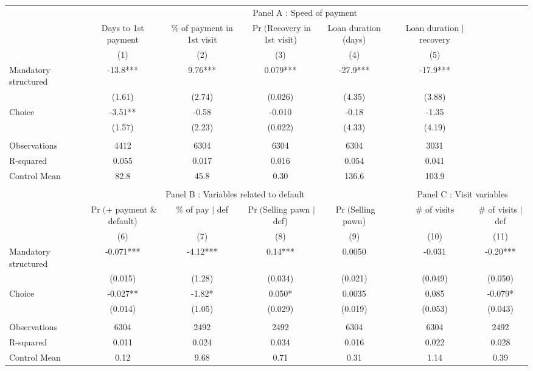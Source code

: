 \begin{tabular}{lccccccc}
\toprule
      & \multicolumn{7}{c}{Panel A  : Speed of payment} \\
\cmidrule{2-8}      & Days to 1st payment & \% of payment in 1st visit & $\Pr($Recovery in 1st visit) & Loan duration (days) &       & Loan duration $|$ recovery &  \\
\cmidrule{1-5}\cmidrule{7-8}      & (1)   & (2)   & (3)   & (4)   &       & (5)   &  \\
\cmidrule{1-5}\cmidrule{7-8}Mandatory structured & -13.8*** & 9.76*** & 0.079*** & -27.9*** &       & -17.9*** &  \\
      & (1.61) & (2.74) & (0.026) & (4.35) &       & (3.88) &  \\
Choice  & -3.51** & -0.58 & -0.010 & -0.18 &       & -1.35 &  \\
      & (1.57) & (2.23) & (0.022) & (4.33) &       & (4.19) &  \\
      &       &       &       &       &       &       &  \\
\cmidrule{1-5}\cmidrule{7-8}Observations & 4412  & 6304  & 6304  & 6304  &       & 3031  &  \\
R-squared & 0.055 & 0.017 & 0.016 & 0.054 &       & 0.041 &  \\
Control Mean & 82.8  & 45.8  & 0.30  & 136.6 &       & 103.9 &  \\
      &       &       &       &       &       &       &  \\
\midrule
      & \multicolumn{4}{c}{Panel B  : Variables related to default} &       & \multicolumn{2}{c}{Panel C  : Visit variables} \\
\cmidrule{2-8}      & $\Pr($+ payment \& default) & \% of pay $|$ def  & $\Pr($Selling pawn $|$ def) & $\Pr($Selling pawn) &       & \# of visits & \# of visits $|$ def \\
\midrule
\midrule
      & (6)   & (7)   & (8)   & (9)   &       & (10)  & (11) \\
\midrule
\midrule
Mandatory structured & -0.071*** & -4.12*** & 0.14*** & 0.0050 &       & -0.031 & -0.20*** \\
      & (0.015) & (1.28) & (0.034) & (0.021) &       & (0.049) & (0.050) \\
Choice  & -0.027** & -1.82* & 0.050* & 0.0035 &       & 0.085 & -0.079* \\
      & (0.014) & (1.05) & (0.029) & (0.019) &       & (0.053) & (0.043) \\
      &       &       &       &       &       &       &  \\
\cmidrule{1-5}\cmidrule{7-8}Observations & 6304  & 2492  & 2492  & 6304  &       & 6304  & 2492 \\
R-squared & 0.011 & 0.024 & 0.034 & 0.016 &       & 0.022 & 0.028 \\
Control Mean & 0.12  & 9.68  & 0.71  & 0.31  &       & 1.14  & 0.39 \\
\bottomrule
\bottomrule
\end{tabular}%
